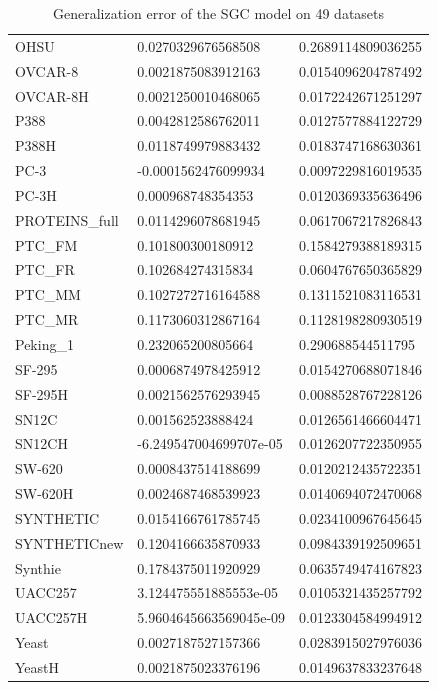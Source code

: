 \begin{table}[!ht]
\begin{tabular}{p{3.5cm}|p{5cm}p{5cm}}
        OHSU & 0.0270329676568508 & 0.2689114809036255 \\
        OVCAR-8 & 0.0021875083912163 & 0.0154096204787492 \\
        OVCAR-8H & 0.0021250010468065 & 0.0172242671251297 \\
        P388 & 0.0042812586762011 & 0.0127577884122729 \\
        P388H & 0.0118749979883432 & 0.0183747168630361 \\
        PC-3 & -0.0001562476099934 & 0.0097229816019535 \\
        PC-3H & 0.000968748354353 & 0.0120369335636496 \\
        PROTEINS\_full & 0.0114296078681945 & 0.0617067217826843 \\
        PTC\_FM & 0.101800300180912 & 0.1584279388189315 \\
        PTC\_FR & 0.102684274315834 & 0.0604767650365829 \\
        PTC\_MM & 0.1027272716164588 & 0.1311521083116531 \\
        PTC\_MR & 0.1173060312867164 & 0.1128198280930519 \\
        Peking\_1 & 0.232065200805664 & 0.290688544511795 \\
        SF-295 & 0.0006874978425912 & 0.0154270688071846 \\
        SF-295H & 0.0021562576293945 & 0.0088528767228126 \\
        SN12C & 0.001562523888424 & 0.0126561466604471 \\
        SN12CH & -6.249547004699707e-05 & 0.0126207722350955 \\
        SW-620 & 0.0008437514188699 & 0.0120212435722351 \\
        SW-620H & 0.0024687468539923 & 0.0140694072470068 \\
        SYNTHETIC & 0.0154166761785745 & 0.0234100967645645 \\
        SYNTHETICnew & 0.1204166635870933 & 0.0984339192509651 \\
        Synthie & 0.1784375011920929 & 0.0635749474167823 \\
        UACC257 & 3.124475551885553e-05 & 0.0105321435257792 \\
        UACC257H & 5.9604645663569045e-09 & 0.0123304584994912 \\
        Yeast & 0.0027187527157366 & 0.0283915027976036 \\
        YeastH & 0.0021875023376196 & 0.0149637833237648 \\
    \end{tabular}
    \caption{Generalization error of the SGC model on 49 datasets}
    \label{tab:ge_sgc} %
\end{table}


